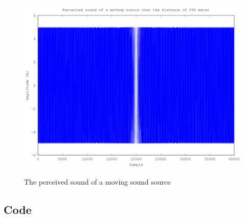 \documentclass{article}
\begin{document}
\begin{figure}[H]
  \centering
  \includegraphics[width=0.7\columnwidth]{plot3.png}\\
  \caption{The perceived sound of a moving sound source}
  \label{fig3}
\end{figure}

\begin{appendices}
\section{Code}








\end{appendices}
\end{document}
